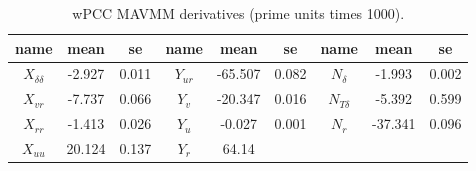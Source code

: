 \begin{table}[!htb]
    \footnotesize
    \centering
    \caption{wPCC MAVMM derivatives (prime units times 1000).}
    \label{\detokenize{06.10_results_wpcc:wpcc-derivatives}}
    \begin{tabular}{|c|c|c|c|c|c|c|c|c|}
\hline


name
&

mean
&

se
&

name
&

mean
&

se
&

name
&

mean
&

se
\\
\hline

\( X_{\delta\delta} \)
&

-2.927
&

0.011
&

\( Y_{ur} \)
&

-65.507
&

0.082
&

\( N_{\delta} \)
&

-1.993
&

0.002
\\


\( X_{vr} \)
&

-7.737
&

0.066
&

\( Y_{v} \)
&

-20.347
&

0.016
&

\( N_{T\delta} \)
&

-5.392
&

0.599
\\


\( X_{rr} \)
&

-1.413
&

0.026
&

\( Y_{u} \)
&

-0.027
&

0.001
&

\( N_{r} \)
&

-37.341
&

0.096
\\


\( X_{uu} \)
&

20.124
&

0.137
&

\( Y_{r} \)
&

64.14
&


\end{tabular}
\end{table}
